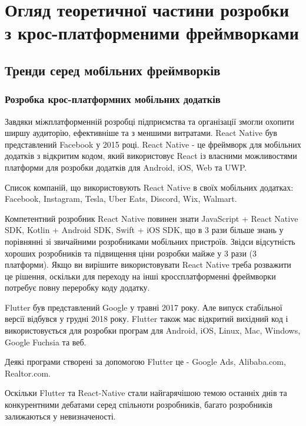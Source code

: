 \renewcommand{\proofname}{Доведення}
\renewcommand{\chaptername}{РОЗДІЛ}


\chapter{Огляд теоретичної частини розробки з крос-платформеними фреймворками}
\label{ch1}


\section{Тренди серед мобільних фреймворків}
\label{sec:trends}

\subsection{Розробка крос-платформних мобільних додатків}
\label{subsec:cross_platform_dev}
Завдяки міжплатформенній розробці підприємства та організації змогли охопити ширшу аудиторію, ефективніше та з меншими витратами.
React Native був представлений Facebook у 2015 році.
React Native - це фреймворк для мобільних додатків з відкритим кодом, який використовує React із власними можливостями платформи для розробки додатків для Android, iOS, Web та UWP.

Список компаній, що використовують React Native в своїх мобільних додатках: Facebook, Instagram, Tesla, Uber Eats, Discord, Wix, Walmart.

Компетентний розробник React Native повинен знати JavaScript + React Native SDK, Kotlin + Android SDK, Swift + iOS SDK, що в 3 рази більше знань у порівнянні зі звичайними розробниками мобільних пристроїв.
Звідси відсутність хороших розробників та підвищення ціни розробки майже у 3 рази (3 платформи).
Якщо ви вирішите використовувати React Native треба розважити це рішення, оскільки для переходу на інші кроссплатформенні фреймворки потребує повну переробку коду додатку.

Flutter був представлений Google у травні 2017 року. Але випуск стабільної версії відбувся у грудні 2018 року.
Flutter також має відкритий вихідний код і використовується для розробки програм для Android, iOS, Linux, Mac, Windows, Google Fuchsia та веб.

Деякі програми створені за допомогою Flutter це - Google Ads, Alibaba.com, Realtor.com.

Оскільки Flutter та React-Native стали найгарячішою темою останніх днів
та конкурентними дебатами серед спільноти розробників, багато розробників залижаються у невизначеності.

